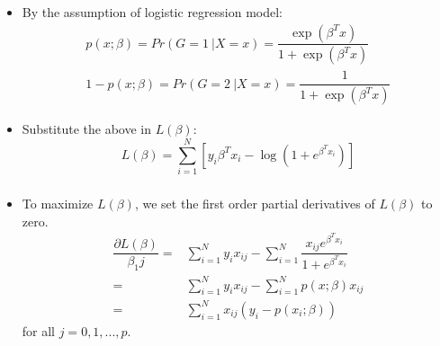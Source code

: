 \documentclass[12pt,notes,mathserif]{beamer}
\begin{document}
\begin{frame}[c]
	\frametitle{}
	\begin{itemize}
		\item By the assumption of logistic regression model:
		      \begin{gather*}
			      p(x;\beta)=Pr(G=1~|X=x)=\dfrac{\exp (\beta^Tx)}{1+\exp(\beta^T x)}\\
			      1-p(x;\beta)=Pr(G=2~|X=x)=\dfrac{1}{1+\exp(\beta^T x)}
		      \end{gather*}
		\item  Substitute the above in $L(\beta)$:
		      \begin{equation*}
			      L(\beta) =\sum\limits_{i=1}^{N}
			      \left[
				      y_i\beta^Tx_i-\log\left(1+e^{\beta^Tx_i}\right)
				      \right]
		      \end{equation*}
	\end{itemize}
\end{frame}

\begin{frame}[c]
	\frametitle{}
	\begin{itemize}
		\item To maximize $L(\beta )$, we set the first order partial derivatives of $L(\beta )$ to zero.
		      \begin{align*}
			      \dfrac{\partial L(\beta )}{\beta_1j}= & \sum\limits_{i=1}^{N}
			      y_i x_{ij}−
			      \sum\limits_{i=1}^{N}
			      \dfrac{x_{ij}e^{\beta^T x_i}}
			      {1 + e^{\beta^T x_i}}                                         \\
			      =                                     & \sum\limits_{i=1}^{N}
			      y_i x_{ij}−
			      \sum\limits_{i=1}^{N}
			      p(x;\beta )x_{ij}                                             \\
			      =                                     &
			      \sum\limits_{i=1}^{N}
			      x_{ij}(y_i − p(x_i;\beta))
		      \end{align*}
		      for all $j = 0,1,...,p$.
	\end{itemize}
\end{frame}
\end{document}
